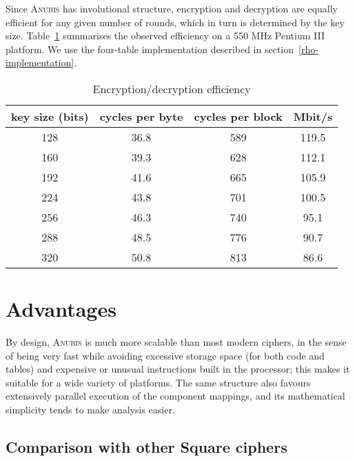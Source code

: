 \documentclass{llncs}
\begin{document}
Since \textsc{Anubis} has involutional structure, encryption and
decryption are equally efficient for any given number of rounds,
which in turn is determined by the key size. Table~\ref{enc-dec}
summarises the observed efficiency on a 550 MHz Pentium III
platform. We use the four-table implementation described in
section~\ref{rho-implementation}.
\begin{table}\centering
\caption{Encryption/decryption efficiency}\label{enc-dec}
\begin{tabular}{|c|c|c|c|} \hline
key size (bits) & cycles per byte & cycles per block & Mbit/s\\ \hline %
128 & 36.8 & 589 & 119.5 \\ \hline %
160 & 39.3 & 628 & 112.1 \\ \hline %
192 & 41.6 & 665 & 105.9 \\ \hline %
224 & 43.8 & 701 & 100.5 \\ \hline %
256 & 46.3 & 740 &  95.1 \\ \hline %
288 & 48.5 & 776 &  90.7 \\ \hline %
320 & 50.8 & 813 &  86.6 \\ \hline %
\end{tabular}
\end{table}

\section{Advantages}\label{advantages}

By design, \textsc{Anubis} is much more scalable than most
modern ciphers, in the sense of being very fast while avoiding
excessive storage space (for both code and tables) and expensive
or unusual instructions built in the processor; this makes it
suitable for a wide variety of platforms.  The same structure also
favours extensively parallel execution of the component mappings,
and its mathematical simplicity tends to make analysis easier.

\subsection{Comparison with other Square ciphers}
\end{document}
